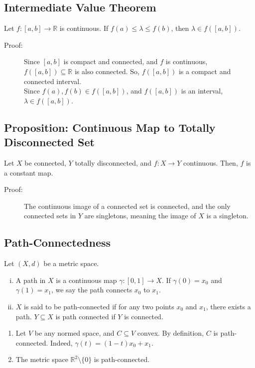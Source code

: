 \documentclass[10pt]{extarticle}
\newcommand{\R}{\mathbb{R}}
\begin{document}
  \subsection{Intermediate Value Theorem}%
  Let $f: [a,b]\rightarrow \R$ is continuous. If $f(a)\leq \lambda \leq f(b)$, then $\lambda \in f([a,b])$.
  \begin{description}
    \item[Proof:] Since $[a,b]$ is compact and connected, and $f$ is continuous, $f([a,b])\subseteq \R$ is also connected. So, $f([a,b])$ is a compact and connected interval.\\

      Since $f(a),f(b)\in f([a,b])$, and $f([a,b])$ is an interval, $\lambda \in f([a,b])$.
  \end{description}
  \subsection{Proposition: Continuous Map to Totally Disconnected Set}%
  Let $X$ be connected, $Y$ totally disconnected, and $f: X\rightarrow Y$ continuous. Then, $f$ is a constant map.
  \begin{description}
    \item[Proof:] The continuous image of a connected set is connected, and the only connected sets in $Y$ are singletons, meaning the image of $X$ is a singleton.
  \end{description}
  \subsection{Path-Connectedness}%
  Let $(X,d)$ be a metric space.
  \begin{enumerate}[(i)]
    \item A path in $X$ is a continuous map $\gamma: [0,1]\rightarrow X$. If $\gamma(0) = x_0$ and $\gamma(1) = x_1$, we say the path connects $x_0$ to $x_1$.
    \item $X$ is said to be path-connected if for any two points $x_0$ and $x_1$, there exists a path. $Y\subseteq X$ is path connected if $Y$ is connected.
  \end{enumerate}
  \begin{enumerate}[(1)]
    \item Let $V$ be any normed space, and $C\subseteq V$ convex. By definition, $C$ is path-connected. Indeed, $\gamma(t) = (1-t)x_0 + x_1$.
    \item The metric space $\R^2\setminus \{0\}$ is path-connected.
  \end{enumerate}
\end{document}

